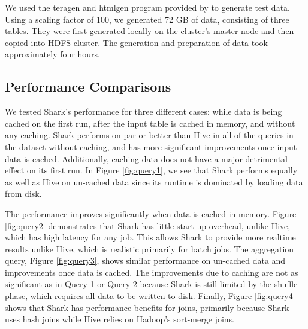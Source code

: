 

We used the teragen and htmlgen program provided by \cite{pavlo2009comparison} to generate test data. Using a scaling factor of 100, we generated 72 GB of data, consisting of three tables. They were first generated locally on the cluster's master node and then copied into HDFS cluster. The generation and preparation of data took approximately four hours.


\subsection{Performance Comparisons}

We tested Shark's performance for three different cases: while data is being cached on the first run, after the input table is cached in memory, and without any caching. Shark performs on par or better than Hive in all of the queries in the \cite{pavlo2009comparison} dataset without caching, and has more significant improvements once input data is cached. Additionally, caching data does not have a major detrimental effect on its first run. In Figure \ref{fig:query1}, we see that Shark performs equally as well as Hive on un-cached data since its runtime is dominated by loading data from disk. 

The performance improves significantly when data is cached in memory. Figure \ref{fig:query2} demonstrates that Shark has little start-up overhead, unlike Hive, which has high latency for any job. This allows Shark to provide more realtime results unlike Hive, which is realistic primarily for batch jobs. The aggregation query, Figure \ref{fig:query3}, shows similar performance on un-cached data and improvements once data is cached. The improvements due to caching are not as significant as in Query 1 or Query 2 because Shark is still limited by the shuffle phase, which requires all data to be written to disk. Finally, Figure \ref{fig:query4} shows that Shark has performance benefits for joins, primarily because Shark uses hash joins while Hive relies on Hadoop's sort-merge joins.

